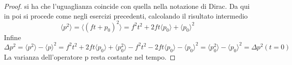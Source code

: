 \begin{proof}
si ha che l'uguaglianza coincide con quella nella notazione di Dirac. Da qui in poi si procede come negli esercizi precedenti, calcolando il risultato intermedio
\begin{equation*}
	\langle p^2 \rangle = \langle (ft+p_0)^2 \rangle = f^2t^2 + 2ft \langle p_0 \rangle + \langle p_0 \rangle^2
\end{equation*}
Infine 
\begin{equation*}
	\Delta p^2 = \langle p^2 \rangle - \langle p \rangle ^2 = f^2t^2 + 2ft \langle p_0 \rangle + \langle p_0^2\rangle - f^2t^2-2ft\langle p_0 \rangle - \langle p_0 \rangle^2 = \langle p_0^2 \rangle - \langle p_0 \rangle^2 = \Delta p^2(t=0) 
\end{equation*}
La varianza dell'operatore p resta costante nel tempo.
\end{proof}
